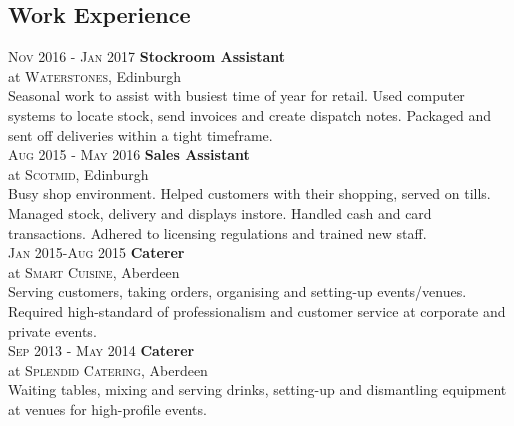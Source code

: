 \documentclass[12pt, a4paper]{article}
\begin{document}
\begin{multicols}{2}
\section{Work Experience}
\small{
\textsc{Nov 2016 - Jan 2017} \textbf{Stockroom Assistant}\\
at \textsc{Waterstones}, Edinburgh\\
Seasonal work to assist with busiest time of year for retail. Used computer systems to locate stock, send invoices and create dispatch notes. Packaged and sent off deliveries within a tight timeframe.\\
\textsc{Aug 2015 - May 2016} \textbf{Sales Assistant}\\
at \textsc{Scotmid}, Edinburgh\\
Busy shop environment. Helped customers with their shopping, served on tills. Managed stock, delivery and displays instore. Handled cash and card transactions. Adhered to licensing regulations and trained new staff.} \\
\textsc{Jan 2015-Aug 2015} \textbf{Caterer}\\
at \textsc{Smart Cuisine}, Aberdeen\\
Serving customers, taking orders, organising and setting-up events/venues. Required high-standard of professionalism and customer service at corporate and private events.\\
\textsc{Sep 2013 - May 2014} \textbf{Caterer}\\
at \textsc{Splendid Catering}, Aberdeen\\
Waiting tables, mixing and serving drinks, setting-up and dismantling equipment at venues for high-profile events.\\
\end{multicols}
\end{document}
